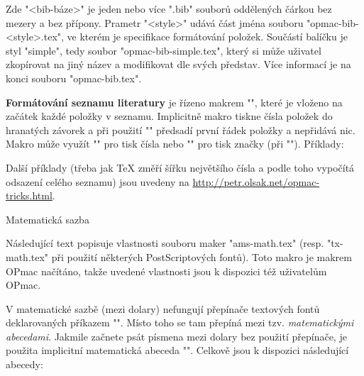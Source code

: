 Zde "<bib-báze>" je jeden nebo více ".bib" souborů oddělených čárkou bez
mezery a bez přípony. Prametr "<style>" udává část jména souboru
"opmac-bib-<style>.tex", ve kterém je specifikace formátování položek.
Součástí balíčku je styl "simple", tedy soubor "opmac-bib-simple.tex",
který si může uživatel zkopírovat na jiný název a modifikovat dle svých
představ. Více informací je na konci souboru "opmac-bib.tex".

\medskip
\noindent 
{\bf Formátování seznamu literatury} je řízeno makrem "\printbib",
které je vloženo na začátek každé položky v seznamu. 
Implicitně makro tiskne čísla položek do
hranatých závorek a při použití "\nonumcitations" předsadí první řádek
položky a nepřidává nic. Makro může využít "\the\bibnum" pro tisk 
čísla nebo "\the\bibmark" pro tisk značky (při "\nonumcitations").
Příklady:

\begtt
\def\printbib{\hangindent=\parindent \indent \llap{\the\bibnum. }}

\def\printbib{\hangindent=\parindent \noindent [\the\bibmark]\quad}
\endtt

Další příklady (třeba jak \TeX{} změří šířku největšího čísla a podle toho
vypočítá odsazení celého seznamu) jsou uvedeny na
\url{http://petr.olsak.net/opmac-tricks.html}.

\sec Matematická sazba

Následující text popisuje vlastnosti souboru maker "ams-math.tex" (resp.
"tx-math.tex" při použití některých PostScriptových fontů). Toto makro je
makrem OPmac načítáno, takže uvedené vlastnosti jsou k dispozici též
uživatelům OPmac.

V matematické sazbě (mezi dolary) nefungují přepínače textových fontů
deklarovaných příkazem "\font". Místo toho se tam přepíná mezi tzv. {\it
matematickými abecedami}. Jakmile začnete psát písmena
mezi dolary bez použití přepínače, je použita implicitní matematická abeceda
"\mit". Celkově jsou k dispozici následující abecedy:

{\def\tthook{\catcode`\$=3 \catcode`/=0 \medmuskip=0mu \adef{ }{ }}%
\begtt
\mit     %
\it      %
\rm      %
\cal     %
\script  %
\frak    %
\bbchar  %
\bf      %
\bi      %
\endtt
}

